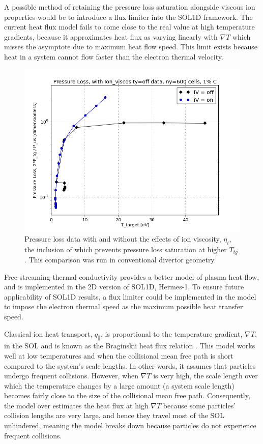 \documentclass[12pt]{article}  %
\providecommand{\Ttg}{$T_{tg}~$} %
\newcommand{\citep}[1]{\cite{#1}}
\begin{document}
A possible method of retaining the pressure loss saturation alongside viscous ion properties would be to introduce a flux limiter into the SOL1D framework. The current heat flux model \cite{Braginskii1965} fails to come close to the real value at high temperature gradients, because it approximates heat flux as varying linearly with $\nabla T$ which misses the asymptote due to maximum heat flow speed. This limit exists because heat in a system cannot flow faster than the electron thermal velocity.

\begin{figure}
	\includegraphics[scale=0.5]{Figures/sol1d/PL_iVpts.png}
	\centering
	\caption{Pressure loss data with and without the effects of ion viscosity, $\eta_i$, the inclusion of which prevents pressure loss saturation at higher \Ttg. This comparison was run in conventional divertor geometry.}\label{figPL_iVpts}
\end{figure}

Free-streaming thermal conductivity provides a better model of plasma heat flow, and is implemented in the 2D version of SOL1D, Hermes-1. To ensure future applicability of SOL1D results, a flux limiter could be implemented in the model to impose the electron thermal speed as the maximum possible heat transfer speed.

Classical ion heat transport, $q_{\parallel}$, is proportional to the temperature gradient, $\nabla T$, in the SOL and is known as the Braginskii heat flux relation \citep{Braginskii1965}. This model works well at low temperatures and when the collisional mean free path is short compared to the system's scale lengths. In other words, it assumes that particles undergo frequent collisions. However, when $\nabla T$ is very high, the scale length over which the temperature changes by a large amount (a system scale length) becomes fairly close to the size of the collisional mean free path. Consequently, the model over estimates the heat flux at high $\nabla T$ because some particles' collision lengths are very large, and hence they travel most of the SOL unhindered, meaning the model breaks down because particles do not experience frequent collisions.
\end{document}
